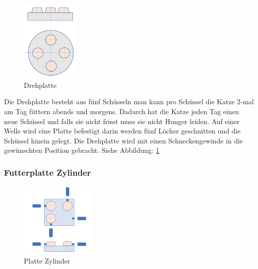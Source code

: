 \begin{figure}
\vspace{-40pt}
  \begin{center}
    \includegraphics[width=0.25\textwidth]{Bilder/Powerpoint/Drehplatte}
  \end{center}
  \caption{Drehplatte}
  \label{Drehplatte}
  \vspace{-20pt}
\end{figure}

Die Drehplatte besteht aus fünf Schüsseln man kann pro Schüssel die Katze 2-mal am Tag füttern abends und morgens. Dadurch hat die Katze jeden Tag einen neue Schüssel und falls sie nicht frisst muss sie nicht Hunger leiden. Auf einer Welle wird eine Platte befestigt 
darin werden fünf Löcher geschnitten und die Schüssel hinein gelegt. Die Drehplatte wird mit einen Schneckengewinde in die gewünschten Position gebracht. Siehe Abbildung:  	
 \ref{Drehplatte} \vspace{+80pt}
 

\subsubsection{Futterplatte Zylinder}

\begin{figure}
\vspace{-50pt}
  \begin{center}
    \includegraphics[width=0.32\textwidth]{Bilder/Powerpoint/Platte_Zylinder}
  \end{center}
  \caption{Platte Zylinder}
  \label{Platte Zylinder}
  \vspace{-20pt}
\end{figure}

